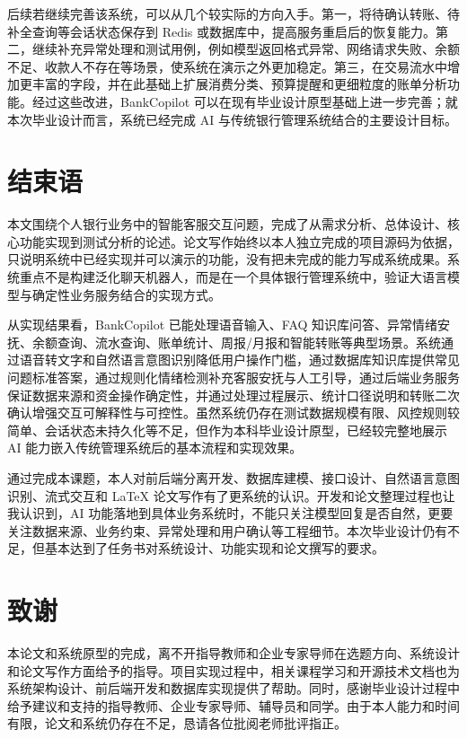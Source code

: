 \documentclass[bachelor, print]{xduthesis}
\begin{document}
后续若继续完善该系统，可以从几个较实际的方向入手。第一，将待确认转账、待补全查询等会话状态保存到 Redis 或数据库中，提高服务重启后的恢复能力。第二，继续补充异常处理和测试用例，例如模型返回格式异常、网络请求失败、余额不足、收款人不存在等场景，使系统在演示之外更加稳定。第三，在交易流水中增加更丰富的字段，并在此基础上扩展消费分类、预算提醒和更细粒度的账单分析功能。经过这些改进，BankCopilot 可以在现有毕业设计原型基础上进一步完善；就本次毕业设计而言，系统已经完成 AI 与传统银行管理系统结合的主要设计目标。

\chapter{结束语}

本文围绕个人银行业务中的智能客服交互问题，完成了从需求分析、总体设计、核心功能实现到测试分析的论述。论文写作始终以本人独立完成的项目源码为依据，只说明系统中已经实现并可以演示的功能，没有把未完成的能力写成系统成果。系统重点不是构建泛化聊天机器人，而是在一个具体银行管理系统中，验证大语言模型与确定性业务服务结合的实现方式。

从实现结果看，BankCopilot 已能处理语音输入、FAQ 知识库问答、异常情绪安抚、余额查询、流水查询、账单统计、周报/月报和智能转账等典型场景。系统通过语音转文字和自然语言意图识别降低用户操作门槛，通过数据库知识库提供常见问题标准答案，通过规则化情绪检测补充客服安抚与人工引导，通过后端业务服务保证数据来源和资金操作确定性，并通过处理过程展示、统计口径说明和转账二次确认增强交互可解释性与可控性。虽然系统仍存在测试数据规模有限、风控规则较简单、会话状态未持久化等不足，但作为本科毕业设计原型，已经较完整地展示 AI 能力嵌入传统管理系统后的基本流程和实现效果。

通过完成本课题，本人对前后端分离开发、数据库建模、接口设计、自然语言意图识别、流式交互和 LaTeX 论文写作有了更系统的认识。开发和论文整理过程也让我认识到，AI 功能落地到具体业务系统时，不能只关注模型回复是否自然，更要关注数据来源、业务约束、异常处理和用户确认等工程细节。本次毕业设计仍有不足，但基本达到了任务书对系统设计、功能实现和论文撰写的要求。

\chapter*{致谢}

本论文和系统原型的完成，离不开指导教师和企业专家导师在选题方向、系统设计和论文写作方面给予的指导。项目实现过程中，相关课程学习和开源技术文档也为系统架构设计、前后端开发和数据库实现提供了帮助。同时，感谢毕业设计过程中给予建议和支持的指导教师、企业专家导师、辅导员和同学。由于本人能力和时间有限，论文和系统仍存在不足，恳请各位批阅老师批评指正。
\end{document}
